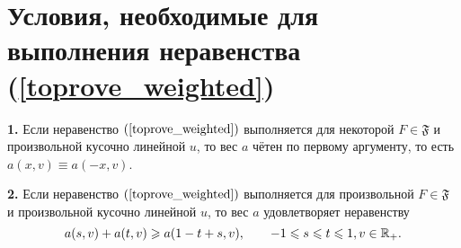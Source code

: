 \section{Условия, необходимые для выполнения неравенства (\ref{toprove_weighted})}


\begin{thm}
\label{necessary_conditions_weighted}
\textbf{1.}
Если неравенство $(\ref{toprove_weighted})$ выполняется для некоторой $F \in \mathfrak{F}$
и произвольной кусочно линейной $u$,
то вес $a$ чётен по первому аргументу,
то есть $a(x, v) \equiv a(-x, v)$.

\textbf{2.}
Если неравенство $(\ref{toprove_weighted})$ выполняется для произвольной $F \in \mathfrak{F}$
и произвольной кусочно линейной $u$, то вес $a$ удовлетворяет неравенству
\begin{equation}
\label{almostConcave}
a(s, v) + a(t, v) \ge a(1 - t + s, v), \qquad -1 \le s \le t \le 1, v \in \Real_+.
\end{equation}
\end{thm}

